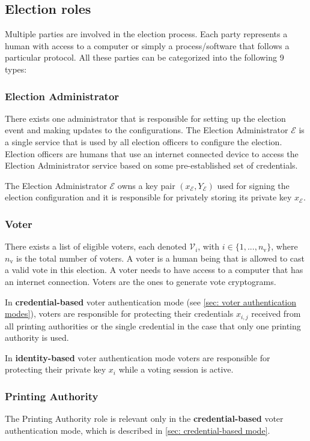\subsection{Election roles} \label{sec: election roles}
Multiple parties are involved in the election process. Each party represents a human with access to a computer or simply a process/software that follows a particular protocol. All these parties can be categorized into the following 9 types: 


\subsubsection{Election Administrator}
There exists one administrator that is responsible for setting up the election event and making updates to the configurations. The Election Administrator $\mathcal{E}$ is a single service that is used by all election officers to configure the election. Election officers are humans that use an internet connected device to access the Election Administrator service based on some pre-established set of credentials.

The Election Administrator $\mathcal{E}$ owns a key pair $(x_\mathcal{E}, Y_\mathcal{E})$ used for signing the election configuration and it is responsible for privately storing its private key $x_\mathcal{E}$.


\subsubsection{Voter}
There exists a list of eligible voters, each denoted $\mathcal{V}_i$, with \( i \in \{ 1, ..., n_\mathrm{v} \} \), where $n_\mathrm{v}$ is the total number of voters.  A voter is a human being that is allowed to cast a valid vote in this election. A voter needs to have access to a computer that has an internet connection. Voters are the ones to generate vote cryptograms.

In \textbf{credential-based} voter authentication mode (see \cref{sec: voter authentication modes}), voters are responsible for protecting their credentials $x_{i,j}$ received from all printing authorities or the single credential in the case that only one printing authority is used.

In \textbf{identity-based} voter authentication mode voters are responsible for protecting their private key $x_i$ while a voting session is active.


\subsubsection{Printing Authority}
The Printing Authority role is relevant only in the \textbf{credential-based} voter authentication mode, which is described in \cref{sec: credential-based mode}.
    
